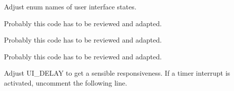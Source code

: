 \begin{DoxyRefList}
%
Adjust enum names of user interface states.  
\item[Global \mbox{\hyperlink{userinterface_8c_a15f87a06f768b9692b824c10a9c709df}{U\+I\+\_\+\+F\+S\+M\+\_\+event\+\_\+\+Touch}} (void)]\label{todo__todo000021}%
%
Probably this code has to be reviewed and adapted. 
\item[Global \mbox{\hyperlink{userinterface_8c_a6aa0164fdca845cfa640d17e630f6d65}{U\+I\+\_\+\+F\+S\+M\+\_\+event\+\_\+\+Pushbutton}} (void)]\label{todo__todo000022}%
%
Probably this code has to be reviewed and adapted. 
\item[Global \mbox{\hyperlink{userinterface_8c_a0b01a6916c8c2e227ffd51e34a7cc87b}{U\+I\+\_\+\+F\+S\+M\+\_\+state\+\_\+value}} (void)]\label{todo__todo000023}%
%
Probably this code has to be reviewed and adapted.

\label{todo__todo000024}%
%
Adjust U\+I\+\_\+\+D\+E\+L\+AY to get a sensible responsiveness. If a timer interrupt is activated, uncomment the following line. 
\end{DoxyRefList}